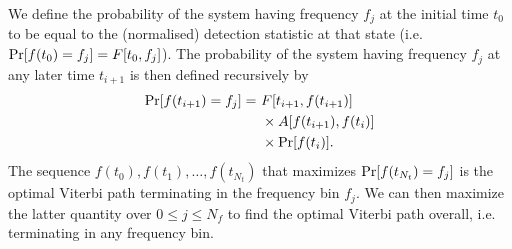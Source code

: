 \documentclass[paper-main.tex]{subfiles}
\begin{document}
We define the probability of the system having frequency $f_j$ at the initial time $t_0$ to be equal to the (normalised) detection statistic at that state (i.e.\  ${\rm Pr}[f(t_0) = f_j] = F[t_0,f_j]$).
The probability of the system having frequency $f_j$ at any later time $t_{i+1}$ is then defined recursively by
\begin{eqnarray}
{\rm Pr}[f(t_{i+1})=f_j] =~& F[t_{i+1},f(t_{i+1})] \nonumber \\
                     &\times A[f(t_{i+1}),f(t_i)]  \nonumber \\
                     &\times {\rm Pr}[f(t_i)].
\label{eqn:recursiveViterbi}
\end{eqnarray}
The sequence $f(t_0),f(t_1),\dots,f(t_{N_t})$ that maximizes ${\rm Pr}[f(t_{N_t}) = f_j]$ is the optimal Viterbi path terminating in the frequency bin $f_j$. 
We can then maximize the latter quantity over $0 \leq j \leq N_f$ to find the optimal Viterbi path overall, i.e. terminating in any frequency bin. 
\end{document}
